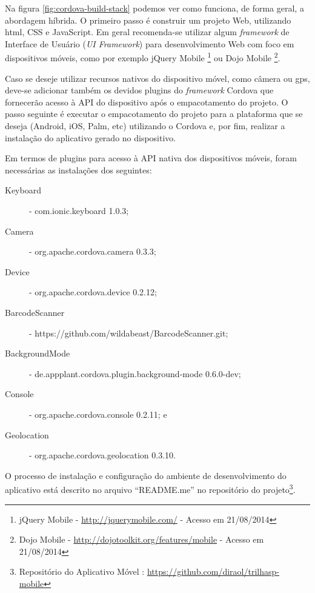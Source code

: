 Na figura \ref{fig:cordova-build-stack} podemos ver como funciona, de forma geral, a abordagem híbrida. O primeiro passo é construir um projeto Web, utilizando \gls{html}, CSS e JavaScript. Em geral recomenda-se utilizar algum \textit{framework} de Interface de Usuário (\textit{UI Framework}) para desenvolvimento Web com foco em dispositivos móveis, como por exemplo jQuery Mobile%
\footnote{jQuery Mobile - \url{http://jquerymobile.com/} - Acesso em 21/08/2014}
ou Dojo Mobile%
\footnote{Dojo Mobile - \url{http://dojotoolkit.org/features/mobile} - Acesso em 21/08/2014}.

Caso se deseje utilizar recursos nativos do dispositivo móvel, como câmera ou gps, deve-se adicionar também os devidos plugins do \textit{framework} Cordova que fornecerão acesso à API do dispositivo após o empacotamento do projeto. O passo seguinte é executar o empacotamento do projeto para a plataforma que se deseja (Android, iOS, Palm, etc) utilizando o Cordova e, por fim, realizar a instalação do aplicativo gerado no dispositivo.

Em termos de plugins para acesso à API nativa dos dispositivos móveis, foram necessárias as instalações dos seguintes:
\begin{description}
    \item[Keyboard] - com.ionic.keyboard 1.0.3;
    \item[Camera] - org.apache.cordova.camera 0.3.3;
    \item[Device] - org.apache.cordova.device 0.2.12;
    \item[BarcodeScanner] - https://github.com/wildabeast/BarcodeScanner.git;
    \item[BackgroundMode] - de.appplant.cordova.plugin.background-mode 0.6.0-dev;
    \item[Console] - org.apache.cordova.console 0.2.11; e
    \item[Geolocation] - org.apache.cordova.geolocation 0.3.10.
\end{description}


O processo de instalação e configuração do ambiente de desenvolvimento do aplicativo está descrito no arquivo ``README.me'' no repositório do projeto\footnote{Repositório do Aplicativo Móvel \trilhasp: \url{https://github.com/diraol/trilhasp-mobile}}.

